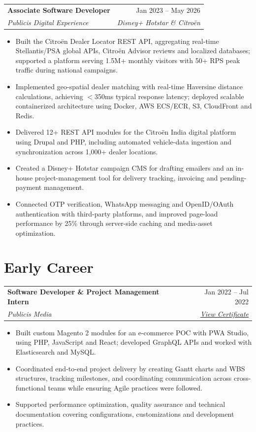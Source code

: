 \documentclass[10pt,a4paper]{article}
\makeatletter
\newcommand{\resumeSubheading}[4]{
  \vspace{1pt}
  \begin{tabularx}{\textwidth}{@{}X r@{}}
    \textbf{#1} & #2 \\
    \textit{#3} & \textit{#4}
  \end{tabularx}
  \vspace{-3pt}
}
\newcommand{\link}[2]{\href{#1}{#2}}
\makeatother
\begin{document}
\resumeSubheading
  {Associate Software Developer}
  {Jan 2023 -- May 2026}
  {Publicis Digital Experience}
  {Disney+ Hotstar \& Citroën}

\begin{itemize}
  \item Built the Citroën Dealer Locator REST API, aggregating real-time Stellantis/PSA global APIs, Citroën Advisor reviews and localized databases; supported a platform serving 1.5M+ monthly visitors with 50+ RPS peak traffic during national campaigns.
  \item Implemented geo-spatial dealer matching with real-time Haversine distance calculations, achieving $<$350ms typical response latency; deployed scalable containerized architecture using Docker, AWS ECS/ECR, S3, CloudFront and Redis.
  \item Delivered 12+ REST API modules for the Citroën India digital platform using Drupal and PHP, including automated vehicle-data ingestion and synchronization across 1,000+ dealer locations.
  \item Created a Disney+ Hotstar campaign CMS for drafting emailers and an in-house project-management tool for delivery tracking, invoicing and pending-payment management.
  \item Connected OTP verification, WhatsApp messaging and OpenID/OAuth authentication with third-party platforms, and improved page-load performance by 25\% through server-side caching and media-asset optimization.
\end{itemize}

\section{Early Career}

\resumeSubheading
  {Software Developer \& Project Management Intern}
  {Jan 2022 -- Jul 2022}
  {Publicis Media}
  {\link{https://github.com/udit-kulkarni98/Certificates/blob/main/InternshipCertificate.pdf}{View Certificate}}

\begin{itemize}
  \item Built custom Magento 2 modules for an e-commerce POC with PWA Studio, using PHP, JavaScript and React; developed GraphQL APIs and worked with Elasticsearch and MySQL.
  \item Coordinated end-to-end project delivery by creating Gantt charts and WBS structures, tracking milestones, and coordinating communication across cross-functional teams while ensuring Agile practices were followed.
  \item Supported performance optimization, quality assurance and technical documentation covering configurations, customizations and development practices.
\end{itemize}
\end{document}
